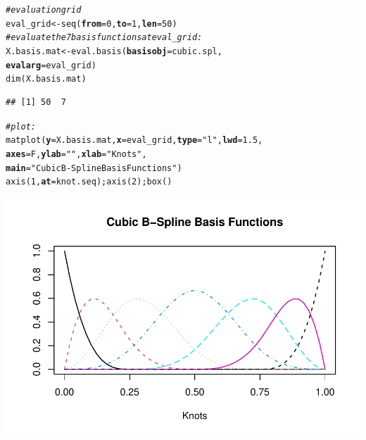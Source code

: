 \documentclass[14pt]{extreport}\usepackage[]{graphicx}\usepackage[]{xcolor}
\makeatletter
\def\maxwidth{ %
  \ifdim\Gin@nat@width>\linewidth
    \linewidth
  \else
    \Gin@nat@width
  \fi
}
\newcommand{\hlnum}[1]{\textcolor[rgb]{0.69,0.494,0}{#1}}%
\newcommand{\hlstr}[1]{\textcolor[rgb]{0.749,0.012,0.012}{#1}}%
\newcommand{\hlcom}[1]{\textcolor[rgb]{0.514,0.506,0.514}{\textit{#1}}}%
\newcommand{\hlstd}[1]{\textcolor[rgb]{0,0,0}{#1}}%
\newcommand{\hlkwb}[1]{\textcolor[rgb]{0,0.341,0.682}{#1}}%
\newcommand{\hlkwc}[1]{\textcolor[rgb]{0,0,0}{\textbf{#1}}}%
\newcommand{\hlkwd}[1]{\textcolor[rgb]{0.004,0.004,0.506}{#1}}%
\newenvironment{kframe}{%
 \def\at@end@of@kframe{}%
 \ifinner\ifhmode%
  \def\at@end@of@kframe{\end{minipage}}%
  \begin{minipage}{\columnwidth}%
 \fi\fi%
 \def\FrameCommand##1{\hskip\@totalleftmargin \hskip-\fboxsep
 \colorbox{shadecolor}{##1}\hskip-\fboxsep
     \hskip-\linewidth \hskip-\@totalleftmargin \hskip\columnwidth}%
 \MakeFramed {\advance\hsize-\width
   \@totalleftmargin\z@ \linewidth\hsize
   \@setminipage}}%
 {\par\unskip\endMakeFramed%
 \at@end@of@kframe}
\newenvironment{knitrout}{}{} %
\makeatother
\begin{document}
\begin{knitrout}
\color{fgcolor}\begin{kframe}
\begin{alltt}
\hlcom{# evaluation grid}
\hlstd{eval_grid}     \hlkwb{<-} \hlkwd{seq}\hlstd{(}\hlkwc{from}\hlstd{=}\hlnum{0}\hlstd{,}\hlkwc{to}\hlstd{=}\hlnum{1}\hlstd{,}\hlkwc{len}\hlstd{=}\hlnum{50}\hlstd{)}
\hlcom{# evaluate the 7 basis functions at eval_grid:}
\hlstd{X.basis.mat} \hlkwb{<-} \hlkwd{eval.basis}\hlstd{(}\hlkwc{basisobj} \hlstd{= cubic.spl,}
                          \hlkwc{evalarg}  \hlstd{= eval_grid)}
\hlkwd{dim}\hlstd{(X.basis.mat)}
\end{alltt}
\begin{verbatim}
## [1] 50  7
\end{verbatim}
\begin{alltt}
\hlcom{# plot:}
\hlkwd{matplot}\hlstd{(}\hlkwc{y}\hlstd{=X.basis.mat,} \hlkwc{x}\hlstd{=eval_grid,} \hlkwc{type}\hlstd{=}\hlstr{"l"}\hlstd{,} \hlkwc{lwd}\hlstd{=}\hlnum{1.5}\hlstd{,}
        \hlkwc{axes}\hlstd{=F,} \hlkwc{ylab}\hlstd{=}\hlstr{""}\hlstd{,} \hlkwc{xlab}\hlstd{=}\hlstr{"Knots"}\hlstd{,}
        \hlkwc{main}\hlstd{=}\hlstr{"Cubic B-Spline Basis Functions"}\hlstd{)}
\hlkwd{axis}\hlstd{(}\hlnum{1}\hlstd{,} \hlkwc{at}\hlstd{=knot.seq);} \hlkwd{axis}\hlstd{(}\hlnum{2}\hlstd{);} \hlkwd{box}\hlstd{()}
\end{alltt}
\end{kframe}

{\centering \includegraphics[width=\maxwidth]{figure/unnamed-chunk-6-1} 

}


\end{knitrout}
\end{document}

